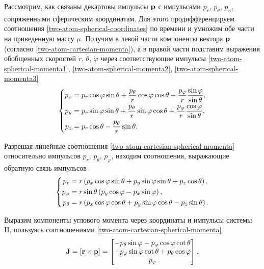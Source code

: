 Рассмотрим, как связаны декартовы импульсы $\mathbf{p}$ с импульсами $p_r$, $p_\theta$, $p_\varphi$, сопряженными сферическим координатам. Для этого продифференцируем соотношения \eqref{two-atom-spherical-coordinates} по времени и умножим обе части на приведенную массу $\mu$. Получим в левой части компоненты вектора $\mathbf{p}$ (согласно \eqref{two-atom-cartesian-momenta}), а в правой части подставим выражения обобщенных скоростей $\dot{r}$, $\dot{\theta}$, $\dot{\varphi}$ через соответствующие импульсы \eqref{two-atom-spherical-momenta1}, \eqref{two-atom-spherical-momenta2}, \eqref{two-atom-spherical-momenta3}
\begin{gather}
    \left\{ 
    \begin{aligned}
        p_x &= p_r \cos \varphi \sin \theta + \frac{p_\theta}{r} \cos \varphi \cos \theta - \frac{p_\varphi}{r} \frac{\sin \varphi}{\sin \theta}, \\ 
        p_y &= p_r \sin \varphi \sin \theta + \frac{p_\theta}{r} \sin \varphi \cos \theta + \frac{p_\varphi}{r} \frac{\cos \varphi}{\sin \theta}, \\ 
        p_z &= p_r \cos \theta - \frac{p_\theta}{r} \sin \theta.
    \end{aligned}
    \right. \label{two-atom-cartesian-spherical-momenta}
\end{gather}

Разрешая линейные соотношения \eqref{two-atom-cartesian-spherical-momenta} относительно импульсов $p_r$, $p_\theta$, $p_\varphi$, находим соотношения, выражающие обратную связь импульсов
\begin{gather}
    \left\{
    \begin{aligned}
        p_r &= r \left( p_x \cos \varphi \sin \theta + p_y \sin \varphi \sin \theta + p_z \cos \theta \right), \\
        p_\varphi &= r \sin \theta \left( p_y \cos \varphi - p_x \sin \varphi \right), \\
        p_\theta &= r \left( p_x \cos \varphi \cos \theta + p_y \sin \varphi \cos \theta - p_z \sin \theta \right).  
    \end{aligned}
    \right.
\end{gather}

Выразим компоненты углового момента через координаты и импульсы системы II, пользуясь соотношениями \eqref{two-atom-cartesian-spherical-momenta}
\begin{gather}
    \mathbf{J} = \left[ \mathbf{r} \times \mathbf{p} \right] = 
    \begin{bmatrix}
        -p_\theta \sin \varphi - p_\varphi \cos \varphi \cot \theta \\
        -p_\varphi \sin \varphi \cot \theta + p_\theta \cos \varphi \\
        p_\varphi
    \end{bmatrix}. \label{two-atom-angular-momenta-spherical} 
\end{gather}

